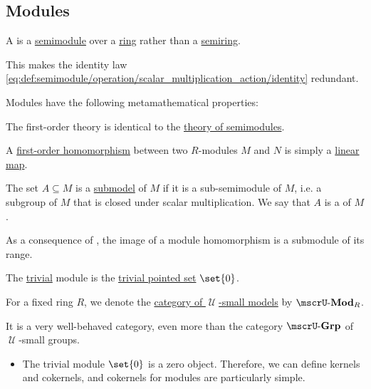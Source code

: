\subsection{Modules}\label{subsec:modules}

\begin{definition}\label{def:module}
  A  is a \hyperref[def:semimodule]{semimodule} over a \hyperref[def:ring]{ring} rather than a \hyperref[def:semiring]{semiring}.

  This makes the identity law \eqref{eq:def:semimodule/operation/scalar_multiplication_action/identity} redundant.

  Modules have the following metamathematical properties:
  \begin{thmenum}
     The first-order theory is identical to the \hyperref[def:semimodule/theory]{theory of semimodules}.

     A \hyperref[def:first_order_homomorphism]{first-order homomorphism} between two \( R \)-modules \( M \) and \( N \) is simply a \hyperref[def:semimodule/homomorphism]{linear map}.

     The set \( A \subseteq M \) is a \hyperref[thm:substructure_is_model]{submodel} of \( M \) if it is a sub-semimodule of \( M \), i.e. a subgroup of \( M \) that is closed under scalar multiplication. We say that \( A \) is a  of \( M \).

    As a consequence of , the image of a module homomorphism is a submodule of its range.

     The \hyperref[thm:substructures_form_complete_lattice/bottom]{trivial} module is the \hyperref[def:pointed_set/trivial]{trivial pointed set} \( \set{ 0 } \).

     For a fixed ring \( R \), we denote the \hyperref[def:category_of_small_first_order_models]{category of \( \mscrU \)-small models} by \( \ucat{Mod}_R \).

    It is a very well-behaved category, even more than the category \hyperref[def:group/category]{\( \ucat{Grp} \)} of \( \mscrU \)-small groups.
    \begin{itemize}
      \item The trivial module \( \set{ 0 } \) is a zero object. Therefore, we can define kernels and cokernels, and cokernels for modules are particularly simple.


\end{itemize}
\end{thmenum}
\end{definition}

